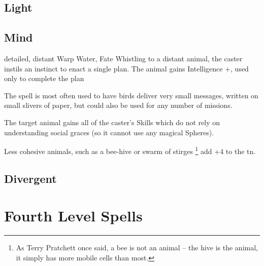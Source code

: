 \begin{multicols}{2}
\subsection{Light}


\subsection{Mind}

  {detailed, distant}%
  {Warp}%
  {Water, Fate}%
  {}%
  {Whistling to a distant animal, the caster instils an instinct to enact a single plan.
  The animal gains Intelligence +, used only to complete the plan}%
  {
  The spell is most often used to have birds deliver very small messages, written on small slivers of paper, but could also be used for any number of missions.

  The target animal gains all of the caster's Skills which do not rely on understanding social graces (so it cannot use any magical Spheres).

  Less cohesive animals, such as a bee-hive or swarm of stirges%
  \footnote{As Terry Pratchett once said, a bee is not an animal -- the hive is the animal, it simply has more mobile cells than most.}
  add +4 to the \gls{tn}.
  }



\subsection{Divergent}


\end{multicols}

\section{Fourth Level Spells}

